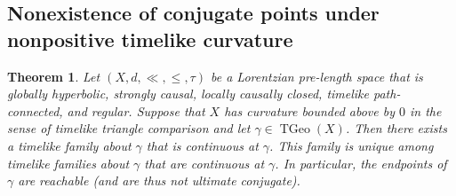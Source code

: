 \documentclass[a4paper,11pt]{article}
\numberwithin{equation}{section}
\theoremstyle{plain}
\newtheorem{Theorem}[Definition]{Theorem}
\theoremstyle{definition}
\DeclareMathOperator{\TGeo}{TGeo}
\begin{document}
\subsection{Nonexistence of conjugate points under nonpositive timelike curvature}
\label{subsection: Conjugate points in spaces with timelike curvature bounds}

\begin{Theorem}
\label{Theorem: cartan hadamard adjacent}
Let $(X,d,\ll,\leq,\tau)$ be a Lorentzian pre-length space that is globally hyperbolic, strongly causal, locally causally closed, timelike path-connected,
and regular. Suppose that $X$ has curvature bounded above by $0$ in the sense of timelike triangle comparison and let $\gamma \in \TGeo(X)$. Then there exists a timelike family about $\gamma$ that is continuous at $\gamma$. This family is unique among timelike families about $\gamma$ that are continuous at $\gamma$. In particular, the endpoints of $\gamma$ are reachable (and are thus not ultimate conjugate).
\end{Theorem}
\end{document}
